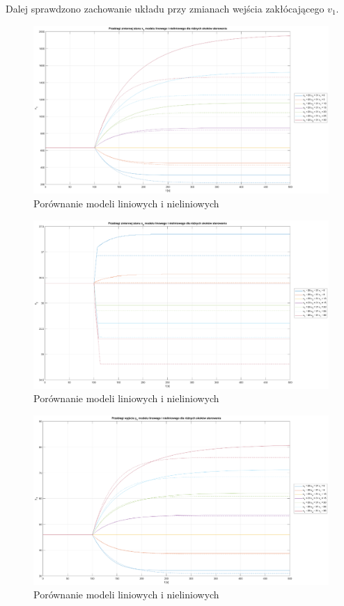Dalej sprawdzono zachowanie układu przy zmianach wejścia zakłócającego $v_1$.

\begin{figure}[H]
    \centering
    \includegraphics[scale=0.35]{images/x1_u1=20_u2=31_v1=30_dt=0.1.eps}
    \caption{Porównanie modeli liniowych i nieliniowych}
\end{figure}

\begin{figure}[H]
    \centering
    \includegraphics[scale=0.35]{images/x2_u1=20_u2=31_v1=30_dt=0.1.eps}
    \caption{Porównanie modeli liniowych i nieliniowych}
\end{figure}

\begin{figure}[H]
    \centering
    \includegraphics[scale=0.35]{images/y1_u1=20_u2=31_v1=30_dt=0.1.eps}
    \caption{Porównanie modeli liniowych i nieliniowych}
\end{figure}

